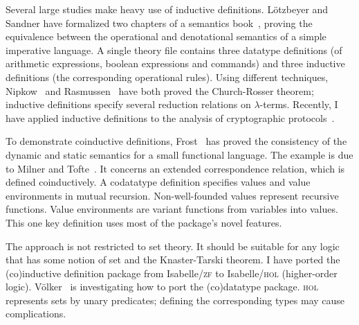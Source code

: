 \documentclass[12pt]{article}
\begin{document}
Several large studies make heavy use of inductive definitions.  L\"otzbeyer
and Sandner have formalized two chapters of a semantics book~\cite{winskel93},
proving the equivalence between the operational and denotational semantics of
a simple imperative language.  A single theory file contains three datatype
definitions (of arithmetic expressions, boolean expressions and commands) and
three inductive definitions (the corresponding operational rules).  Using
different techniques, Nipkow~\cite{nipkow-CR} and Rasmussen~\cite{rasmussen95}
have both proved the Church-Rosser theorem; inductive definitions specify
several reduction relations on $\lambda$-terms.  Recently, I have applied
inductive definitions to the analysis of cryptographic
protocols~\cite{paulson-markt}. 

To demonstrate coinductive definitions, Frost~\cite{frost95} has proved the
consistency of the dynamic and static semantics for a small functional
language.  The example is due to Milner and Tofte~\cite{milner-coind}.  It
concerns an extended correspondence relation, which is defined coinductively.
A codatatype definition specifies values and value environments in mutual
recursion.  Non-well-founded values represent recursive functions.  Value
environments are variant functions from variables into values.  This one key
definition uses most of the package's novel features.

The approach is not restricted to set theory.  It should be suitable for any
logic that has some notion of set and the Knaster-Tarski theorem.  I have
ported the (co)inductive definition package from Isabelle/\textsc{zf} to
Isabelle/\textsc{hol} (higher-order logic).  V\"olker~\cite{voelker95}
is investigating how to port the (co)datatype package.  \textsc{hol}
represents sets by unary predicates; defining the corresponding types may
cause complications.


\begin{footnotesize}


\end{footnotesize}
\end{document}
